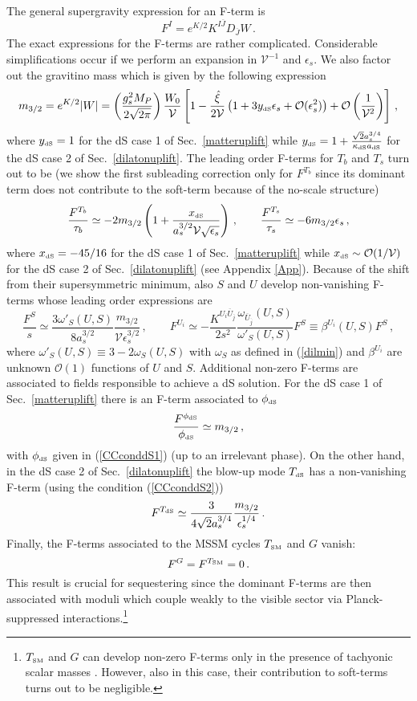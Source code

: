 \documentclass[11pt,a4paper]{article}
\newcommand{\be}{\begin{equation}}
\newcommand{\ee}{\end{equation}}
\def\SM{{\scriptscriptstyle \rm SM}}
\def\dS{{\scriptscriptstyle \rm dS}}
\newcommand\vo{{\mathcal{V}}}
\newcommand{\mc}{\mathcal}
\begin{document}
The general supergravity expression for an F-term is \cite{Kaplunovsky:1993rd, Brignole:1993dj}
\be
F^I = e^{K/2} K^{I \overline{J}} D_{\overline{J}} W\,.
\ee
The exact expressions for the F-terms are rather complicated. Considerable simplifications occur
if we perform an expansion in $\vo^{-1}$ and $\epsilon_s$. We also factor out the gravitino mass which is given by the following expression
\be
m_{3/2}=e^{K/2} |W|= \left(\frac{g_s^2 M_P}{2\sqrt{2\pi}}\right)\frac{W_0}{\vo} \left[ 1-\frac{\hat{\xi}}{2\vo}
\left(1+3 y_\dS \epsilon_s+\mc{O}(\epsilon_s^2)\right)+\mc{O}\left(\frac{1}{\vo^2}\right)\right]\,,
\label{expandm32}
\ee
where $y_\dS =1$ for the dS case 1 of Sec.~\ref{matteruplift} while $y_\dS = 1+\frac{\sqrt{2} a_s^{3/4}}{\kappa_\dS a_\dS}$ for the dS case 2 of Sec.~\ref{dilatonuplift}. The leading order F-terms for $T_b$ and $T_s$ turn out to be
(we show the first subleading correction only for $F^{T_b}$ since its dominant term
does not contribute to the soft-term because of the no-scale structure)
\be
\frac{F^{T_b}}{\tau_b} \simeq - 2 m_{3/2} \left(1+\frac{x_\dS}{a_s^{3/2} \vo\sqrt{\epsilon_s}}\right)\,,
\qquad
\frac{F^{T_s}}{\tau_s} \simeq - 6   m_{3/2} \epsilon_s\,,
\label{FTb}
\ee
where $x_\dS = - 45/16$ for the dS case 1 of Sec.~\ref{matteruplift} while $x_\dS \sim \mc{O}(1/\vo)$ for the dS case 2 of Sec.~\ref{dilatonuplift}
(see Appendix \ref{App}).
Because of the shift from their supersymmetric minimum, also $S$ and $U$ develop non-vanishing F-terms whose leading order
expressions are
\be
\label{ds}
\frac{F^S}{s} \simeq \frac{3 \omega'_S(U,S) }{8 a_s^{3/2}}  \frac{m_{3/2}}{\vo\epsilon_s^{3/2}}\,, \qquad
F^{U_i} \simeq - \frac{K^{U_i \overline{U}_{\overline{j}}}}{2 s^2}\frac{\omega_{\overline{U}_{\overline{j}}}(U,S)}{\omega'_S(U,S)}F^S\equiv \beta^{U_i}(U,S)F^S\,,
\ee
where $\omega'_S(U,S) \equiv 3 - 2 \omega_S(U,S)$ with $\omega_S$ as defined in (\ref{dilmin}) and $\beta^{U_i}$
are unknown $\mc{O}(1)$ functions of $U$ and $S$.
Additional non-zero F-terms are associated to fields responsible to achieve a dS solution.
For the dS case 1 of Sec.~\ref{matteruplift} there is an F-term associated to $\phi_\dS$
\be
\frac{F^{\phi_\dS}}{\phi_\dS} \simeq m_{3/2}\,,
\ee
with $\phi_\dS$ given in (\ref{CCconddS1}) (up to an irrelevant phase). On the other hand,
in the dS case 2 of Sec.~\ref{dilatonuplift} the blow-up mode $T_\dS$ has a non-vanishing F-term
(using the condition (\ref{CCconddS2}))
\be
F^{T_\dS} \simeq \frac{3}{4\sqrt{2}a_s^{3/4}}\frac{m_{3/2}}{\epsilon_s^{1/4}} \,.
\ee
Finally, the F-terms associated to the MSSM cycles $T_\SM$ and $G$ vanish:
\be
F^G = F^{T_\SM} = 0\, .
\ee
This result is crucial for sequestering since the dominant F-terms are then associated with moduli which couple weakly to the visible sector via Planck-suppressed interactions.\footnote{$T_\SM$ and $G$ can develop non-zero F-terms only in the presence of tachyonic scalar masses \cite{Cicoli:2013cha}. However, also in this case, their contribution to soft-terms turns out to be negligible.}
\end{document}
